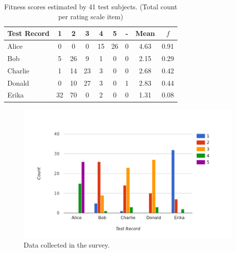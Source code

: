 \begin{table}[H]
\centering
\begin{tabular}{l||c|c|c|c|c|c||c|c}
Test Record & 1 & 2  & 3  & 4  & 5  & - & Mean & $f$ \\
\hline
Alice       & 0  & 0  & 0  & 15 & 26 & 0 & 4.63 & 0.91 \\
Bob         & 5  & 26 & 9  & 1  & 0  & 0 & 2.15 & 0.29 \\
Charlie     & 1  & 14 & 23 & 3  & 0  & 0 & 2.68 & 0.42 \\
Donald      & 0  & 10 & 27 & 3  & 0  & 1 & 2.83 & 0.44 \\
Erika       & 32 & 70 & 0  & 2  & 0  & 0 & 1.31 & 0.08 \\
\end{tabular}
\caption[Survey: Estimated Fitness Scores]{Fitness scores estimated by 41 test subjects. (Total count per rating scale item)}
\label{tab:survey_raw}
\end{table}

\begin{figure}[H]
    \centering
    \includegraphics[width=\textwidth]{images/survey_raw.png}
    \caption[Diagram: Survey Data]{Data collected in the survey.}
    \label{survey_raw}
\end{figure}

\newpage

